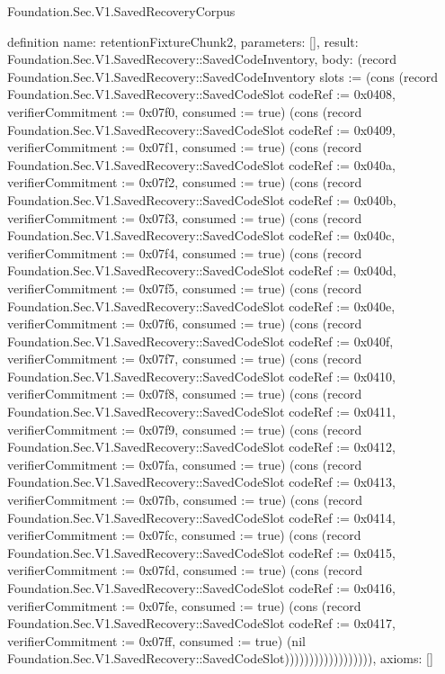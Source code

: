 \begin{lexlean}{Foundation.Sec.V1.SavedRecoveryCorpus}
\begin{semanticmodule}
definition{
  name: retentionFixtureChunk2,
  parameters: [],
  result: Foundation.Sec.V1.SavedRecovery::SavedCodeInventory,
  body: (record Foundation.Sec.V1.SavedRecovery::SavedCodeInventory {slots := (cons (record Foundation.Sec.V1.SavedRecovery::SavedCodeSlot {codeRef := 0x0408, verifierCommitment := 0x07f0, consumed := true}) (cons (record Foundation.Sec.V1.SavedRecovery::SavedCodeSlot {codeRef := 0x0409, verifierCommitment := 0x07f1, consumed := true}) (cons (record Foundation.Sec.V1.SavedRecovery::SavedCodeSlot {codeRef := 0x040a, verifierCommitment := 0x07f2, consumed := true}) (cons (record Foundation.Sec.V1.SavedRecovery::SavedCodeSlot {codeRef := 0x040b, verifierCommitment := 0x07f3, consumed := true}) (cons (record Foundation.Sec.V1.SavedRecovery::SavedCodeSlot {codeRef := 0x040c, verifierCommitment := 0x07f4, consumed := true}) (cons (record Foundation.Sec.V1.SavedRecovery::SavedCodeSlot {codeRef := 0x040d, verifierCommitment := 0x07f5, consumed := true}) (cons (record Foundation.Sec.V1.SavedRecovery::SavedCodeSlot {codeRef := 0x040e, verifierCommitment := 0x07f6, consumed := true}) (cons (record Foundation.Sec.V1.SavedRecovery::SavedCodeSlot {codeRef := 0x040f, verifierCommitment := 0x07f7, consumed := true}) (cons (record Foundation.Sec.V1.SavedRecovery::SavedCodeSlot {codeRef := 0x0410, verifierCommitment := 0x07f8, consumed := true}) (cons (record Foundation.Sec.V1.SavedRecovery::SavedCodeSlot {codeRef := 0x0411, verifierCommitment := 0x07f9, consumed := true}) (cons (record Foundation.Sec.V1.SavedRecovery::SavedCodeSlot {codeRef := 0x0412, verifierCommitment := 0x07fa, consumed := true}) (cons (record Foundation.Sec.V1.SavedRecovery::SavedCodeSlot {codeRef := 0x0413, verifierCommitment := 0x07fb, consumed := true}) (cons (record Foundation.Sec.V1.SavedRecovery::SavedCodeSlot {codeRef := 0x0414, verifierCommitment := 0x07fc, consumed := true}) (cons (record Foundation.Sec.V1.SavedRecovery::SavedCodeSlot {codeRef := 0x0415, verifierCommitment := 0x07fd, consumed := true}) (cons (record Foundation.Sec.V1.SavedRecovery::SavedCodeSlot {codeRef := 0x0416, verifierCommitment := 0x07fe, consumed := true}) (cons (record Foundation.Sec.V1.SavedRecovery::SavedCodeSlot {codeRef := 0x0417, verifierCommitment := 0x07ff, consumed := true}) (nil Foundation.Sec.V1.SavedRecovery::SavedCodeSlot)))))))))))))))))}),
  axioms: []
}


\end{semanticmodule}
\end{lexlean}
